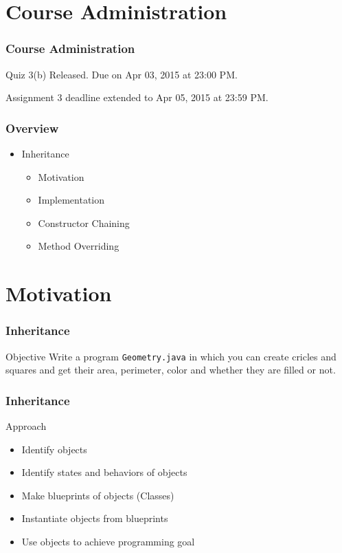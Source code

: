 \documentclass[10pt, compress]{beamer}
\begin{document}
\prepareCover

\section{Course Administration}

\begin{frame}[fragile]
\frametitle{Course Administration}
Quiz 3(b) Released. Due on Apr 03, 2015 at 23:00 PM.

Assignment 3 deadline extended to Apr 05, 2015 at 23:59 PM.
\end{frame}

\begin{frame}[fragile]
  \frametitle{Overview}
  \begin{itemize}
    \item[] Inheritance
    \begin{itemize}
      \item[] Motivation
      \item[] Implementation
      \item[] Constructor Chaining
      \item[] Method Overriding
    \end{itemize}
  \end{itemize}
\end{frame}


\section{Motivation}

\begin{frame}[fragile]
  \frametitle{Inheritance}
  \begin{block}{Objective}
  Write a program \texttt{Geometry.java} in which you can create cricles and squares and get their area, perimeter, color and whether they are filled or not.
  \end{block}
\end{frame}

\begin{frame}[fragile]
  \frametitle{Inheritance}
  \begin{block}{Approach}
    \begin{itemize}
      \item[] Identify objects
      \item[] Identify states and behaviors of objects
      \item[] Make blueprints of objects (Classes)
      \item[] Instantiate objects from blueprints
      \item[] Use objects to achieve programming goal
    \end{itemize}
  \end{block}
\end{frame}
\end{document}

